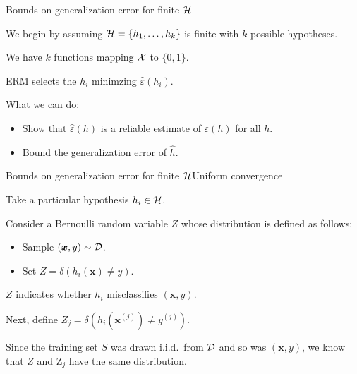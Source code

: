 \documentclass{beamer}
\renewcommand{\vec}[1]{\boldsymbol{#1}}
\begin{document}
\begin{frame}{Bounds on generalization error for finite $\cal H$}

  We begin by assuming ${\cal H} = \{ h_1, \ldots, h_k \}$ is finite with $k$
  possible hypotheses.

  \medskip

  We have $k$ functions mapping $\cal X$ to $\{0,1\}$.

  \medskip

  ERM selects the $h_i$ minimzing $\hat{\varepsilon}(h_i)$.

  \medskip

  What we can do:
  \begin{itemize}
  \item Show that $\hat{\varepsilon}(h)$ is a reliable estimate
    of $\varepsilon(h)$ for all $h$.
  \item Bound the generalization error of $\hat{h}$.
  \end{itemize}
  
\end{frame}


\begin{frame}{Bounds on generalization error for finite $\cal H$}{Uniform convergence}

  Take a particular hypothesis $h_i \in \cal H$.

  \medskip

  Consider a Bernoulli random variable $Z$ whose distribution is
  defined as follows:
  \begin{itemize}
  \item Sample $(\vec{x},y) \sim \cal D$.
  \item Set $Z = \delta(h_i(\vec{x}) \ne y)$.
  \end{itemize}

  \medskip
  
  $Z$ indicates whether $h_i$ misclassifies $(\vec{x},y)$.

  \medskip

  Next, define $Z_j = \delta(h_i(\vec{x}^{(j)}) \ne y^{(j)})$.

  \medskip

  Since the training set $S$ was drawn i.i.d.\ from $\cal D$ and so
  was $(\vec{x},y)$, we know that $Z$ and Z$_j$ have the same
  distribution.
  
\end{frame}
\end{document}
